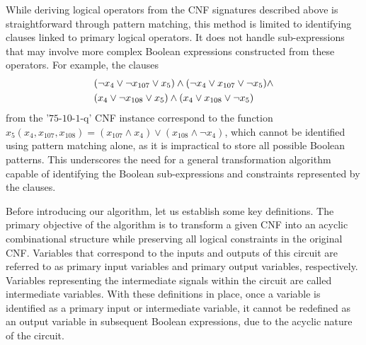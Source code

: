 While deriving logical operators from the CNF signatures described above is straightforward through pattern matching, this method is limited to identifying clauses linked to primary logical operators. It does not handle sub-expressions that may involve more complex Boolean expressions constructed from these operators. For example, the clauses\vspace{-0.2cm}
\begin{align}
    & (\neg x_4 \vee \neg x_{107} \vee x_5) \wedge (\neg x_4 \vee x_{107} \vee \neg x_5) \wedge \nonumber \\
    & (x_4 \vee \neg x_{108} \vee x_5) \wedge (x_4 \vee x_{108} \vee \neg x_5) \vspace{-0.2cm}
    \label{c1}
\end{align}
from the '$75$-$10$-$1$-q' CNF instance correspond to the function $x_5(x_4, x_{107}, x_{108}) = (x_{107} \wedge x_4) \vee (x_{108} \wedge \neg x_4)$, which cannot be identified using pattern matching alone, as it is impractical to store all possible Boolean patterns. This underscores the need for a general transformation algorithm capable of identifying the Boolean sub-expressions and constraints represented by the clauses.

Before introducing our algorithm, let us establish some key definitions. The primary objective of the algorithm is to transform a given CNF into an acyclic combinational structure while preserving all logical constraints in the original CNF. Variables that correspond to the inputs and outputs of this circuit are referred to as primary input variables and primary output variables, respectively. Variables representing the intermediate signals within the circuit are called intermediate variables. With these definitions in place, once a variable is identified as a primary input or intermediate variable, it cannot be redefined as an output variable in subsequent Boolean expressions, due to the acyclic nature of the circuit.

